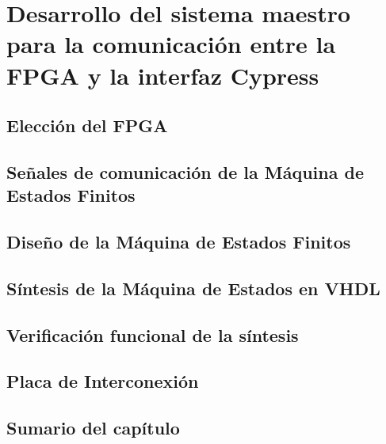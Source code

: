 \chapter{Desarrollo del sistema maestro para la comunicación entre la FPGA y la interfaz Cypress}
	\label{cap:fpga}
	
%		
	\section{Elección del FPGA}
		\label{mats:fpga}
		
	\section{Señales de comunicación de la Máquina de Estados Finitos}
		\label{fpga:sigs}
		
	\section{Diseño de la Máquina de Estados Finitos}
		
	\section{Síntesis de la Máquina de Estados en VHDL}
		
	\section{Verificación funcional de la síntesis}
		
	\section{Placa de Interconexión}
		
		\pagebreak
	\section{Sumario del capítulo}
		